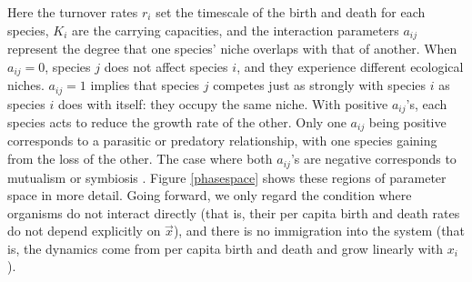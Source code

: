 \documentclass[a4paper,10pt]{article}
\numberwithin{equation}{section} %
\begin{document}
Here the turnover rates $r_i$ set the timescale of the birth and death for each species, 
$K_i$ are the carrying capacities, and the interaction parameters $a_{ij}$ represent the degree that one species' niche overlaps with that of another. 
When $a_{ij}=0$, species $j$ does not affect species $i$, and they experience different ecological niches. 
$a_{ij}=1$ implies that species $j$ competes just as strongly with species $i$ as species $i$ does with itself: they occupy the same niche. 
With positive $a_{ij}$'s, each species acts to reduce the growth rate of the other. %
Only one $a_{ij}$ being positive corresponds to a parasitic or predatory relationship, with one species gaining from the loss of the other. 
The case where both $a_{ij}$'s are negative corresponds to mutualism or symbiosis \cite{Chotibut2015}. 
Figure \ref{phasespace} shows these regions of parameter space in more detail. 
Going forward, we only regard the condition where organisms do not interact directly (that is, their per capita birth and death rates do not depend explicitly on $\vec{x}$), and there is no immigration into the system (that is, the dynamics come from per capita birth and death and grow linearly with $x_i$). 
\end{document}
